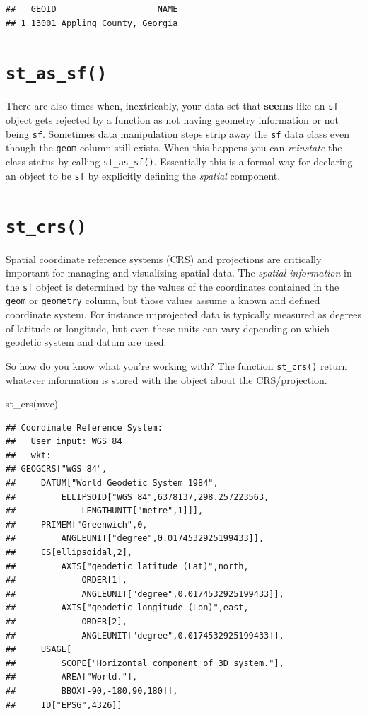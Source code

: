 \documentclass[
]{book}
\newenvironment{Shaded}{\begin{snugshade}}{\end{snugshade}}
\newcommand{\FunctionTok}[1]{\textcolor[rgb]{0.00,0.00,0.00}{#1}}
\newcommand{\NormalTok}[1]{#1}
\begin{document}
\begin{verbatim}
##   GEOID                    NAME
## 1 13001 Appling County, Georgia
\end{verbatim}

\hypertarget{st-as-sf}{%
\section{\texorpdfstring{\texttt{st\_as\_sf()}}{st\_as\_sf()}}\label{st-as-sf}}

There are also times when, inextricably, your data set that \textbf{seems} like an \texttt{sf} object gets rejected by a function as not having geometry information or not being \texttt{sf}. Sometimes data manipulation steps strip away the \texttt{sf} data class even though the \texttt{geom} column still exists. When this happens you can \emph{reinstate} the class status by calling \texttt{st\_as\_sf()}. Essentially this is a formal way for declaring an object to be \texttt{sf} by explicitly defining the \emph{spatial} component.

\hypertarget{st_crs}{%
\section{\texorpdfstring{\texttt{st\_crs()}}{st\_crs()}}\label{st_crs}}

Spatial coordinate reference systems (CRS) and projections are critically important for managing and visualizing spatial data. The \emph{spatial information} in the \texttt{sf} object is determined by the values of the coordinates contained in the \texttt{geom} or \texttt{geometry} column, but those values assume a known and defined coordinate system. For instance unprojected data is typically measured as degrees of latitude or longitude, but even these units can vary depending on which geodetic system and datum are used.

So how do you know what you're working with? The function \texttt{st\_crs()} return whatever information is stored with the object about the CRS/projection.

\begin{Shaded}
\begin{Highlighting}[]
\FunctionTok{st\_crs}\NormalTok{(mvc)}
\end{Highlighting}
\end{Shaded}

\begin{verbatim}
## Coordinate Reference System:
##   User input: WGS 84 
##   wkt:
## GEOGCRS["WGS 84",
##     DATUM["World Geodetic System 1984",
##         ELLIPSOID["WGS 84",6378137,298.257223563,
##             LENGTHUNIT["metre",1]]],
##     PRIMEM["Greenwich",0,
##         ANGLEUNIT["degree",0.0174532925199433]],
##     CS[ellipsoidal,2],
##         AXIS["geodetic latitude (Lat)",north,
##             ORDER[1],
##             ANGLEUNIT["degree",0.0174532925199433]],
##         AXIS["geodetic longitude (Lon)",east,
##             ORDER[2],
##             ANGLEUNIT["degree",0.0174532925199433]],
##     USAGE[
##         SCOPE["Horizontal component of 3D system."],
##         AREA["World."],
##         BBOX[-90,-180,90,180]],
##     ID["EPSG",4326]]
\end{verbatim}
\end{document}

